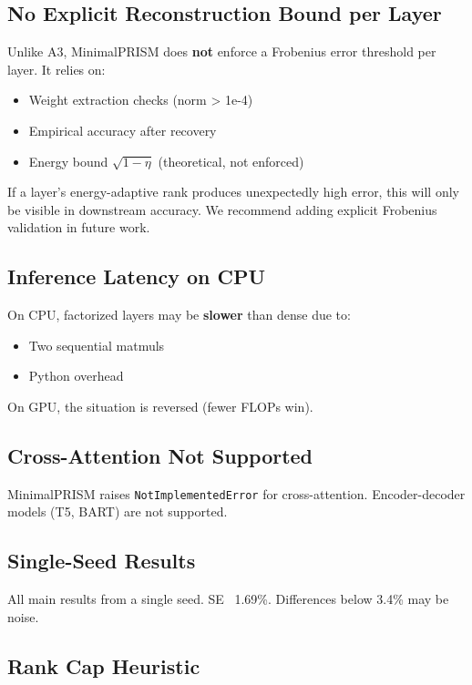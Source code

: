 \subsection{No Explicit Reconstruction Bound per Layer}

Unlike A3, MinimalPRISM does \textbf{not} enforce a Frobenius error threshold 
per layer. It relies on:
\begin{itemize}
\item Weight extraction checks (norm > 1e-4)
\item Empirical accuracy after recovery
\item Energy bound $\sqrt{1 - \eta}$ (theoretical, not enforced)

\end{itemize}
If a layer's energy-adaptive rank produces unexpectedly high error, this 
will only be visible in downstream accuracy. We recommend adding explicit 
Frobenius validation in future work.

\subsection{Inference Latency on CPU}

On CPU, factorized layers may be \textbf{slower} than dense due to:
\begin{itemize}
\item Two sequential matmuls
\item Python overhead

\end{itemize}
On GPU, the situation is reversed (fewer FLOPs win).

\subsection{Cross-Attention Not Supported}

MinimalPRISM raises \texttt{NotImplementedError} for cross-attention. 
Encoder-decoder models (T5, BART) are not supported.

\subsection{Single-Seed Results}

All main results from a single seed. SE ~1.69\%. Differences below 3.4\% may 
be noise.

\subsection{Rank Cap Heuristic}

